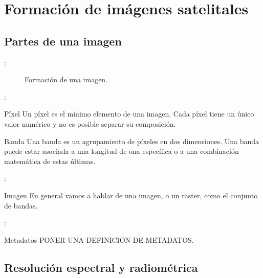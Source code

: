 \section{Formación de imágenes satelitales}
\subsection{Partes de una imagen}

\begin{frame}{\secname : \subsecname}
  \begin{figure}
    \centering
    \caption{Formación de una imagen.}
    \label{}
  \end{figure}
\end{frame}

\begin{frame}{\secname : \subsecname}
\begin{block}{Píxel}
  Un píxel es el mínimo elemento de una imagen. Cada píxel tiene un único valor numérico y no es posible separar su composición.
\end{block}\pause
\begin{block}{Banda}
  Una banda es un agrupamiento de píxeles en dos dimensiones. Una banda puede estar asociada a una longitud de ona específica o a una combinación matemática de estas últimas.
\end{block}
\end{frame}


\begin{frame}{\secname : \subsecname}
  \begin{block}{Imagen}
    En general vamos a hablar de una imagen, o un raster, como el conjunto de bandas.
  \end{block}
\end{frame}

\begin{frame}{\secname : \subsecname}
  \begin{block}{Metadatos}
    PONER UNA DEFINICION DE METADATOS.
  \end{block}
\end{frame}


\subsection{Resolución espectral y radiométrica}

